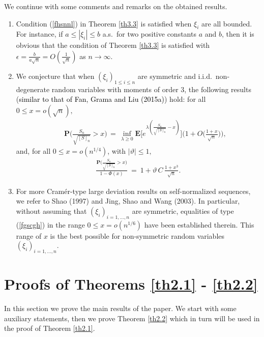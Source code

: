 \documentclass{gSTA2e}
\theoremstyle{plain}
\theoremstyle{definition}
\theoremstyle{remark}
\begin{document}
We continue with some comments and remarks on the obtained results.
\begin{enumerate}

\item Condition (\ref{fhsnnl}) in Theorem \ref{th3.3} is  satisfied when $\xi_i$ are all bounded. For instance,  if $a\leq |\xi_i | \leq b $ a.s.\ for two positive constants $a$ and $b$, then it is obvious that the condition of Theorem \ref{th3.3} is  satisfied with $\epsilon = \frac{b}{a \sqrt{n  } }=O(\frac1{\sqrt{n}})$ as $n \rightarrow \infty.$

\item We conjecture that when $(\xi_i)_{1\leq i \leq n}$ are symmetric and i.i.d.\  non-degenerate random variables with moments of order $3$, the following results (\textcolor{black}{similar to that of Fan, Grama  and Liu (2015a)}) hold: for all $0 \leq x =o(\sqrt{n}),$
\begin{eqnarray}\label{fgscgh01}
\ \ \ \ \ \ \ \ \   \mathbf{P}\Big( \frac{S_n}{\sqrt{[S]_n}} > x \Big) \, =\,
\inf_{\lambda\geq 0} \mathbf{E} \Big[ e^{\lambda (\frac{S_n}{\sqrt{[S]_n}}- x) } \Big]
\Big(1+ O\Big(\frac{1+x}{\sqrt{n}}\Big)  \Big),
\end{eqnarray}
and, for all $ 0 \leq x =o( n^{1/4} ) $, with $|\vartheta| \leq 1,$
\begin{eqnarray}\label{fgscgh}
  \frac{\mathbf{P}\Big( \frac{S_n}{\sqrt{[S]_n}} > x  \Big)}{1-  \Phi(x) } \ = \  1+   \vartheta \, C \, \frac{1+ x^3 }{\sqrt{n}}.
\end{eqnarray}



\item For more Cram\'{e}r-type large deviation results on self-normalized sequences, we refer to  Shao (1997) and Jing, Shao and Wang (2003).  In particular, without assuming that $(\xi _i)_{i=1,...,n}$ are symmetric, equalities of type (\ref{fgscgh}) in the range $0 \leq x =o( n^{1/6} )$ have been established therein. This range of $x$ is the best possible for non-symmetric random variables $(\xi _i)_{i=1,...,n}.$ 

\end{enumerate}


\section{Proofs of Theorems \ref{th2.1} - \ref{th2.2}}\label{sec4}
In this section we prove the main results of the paper.
We start with some auxiliary statements, then we prove Theorem  \ref{th2.2}   which in turn will be used in the proof of Theorem  \ref{th2.1}.
\end{document}
